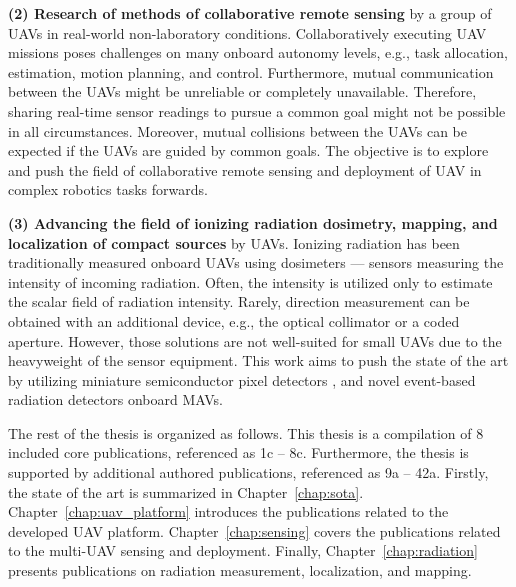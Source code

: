 \documentclass[a4paper,11pt,twoside,openright]{book}
\begin{document}
\textbf{(2) Research of methods of collaborative remote sensing} by a group of \aclp{UAV} in real-world non-laboratory conditions.
Collaboratively executing UAV missions poses challenges on many onboard autonomy levels, e.g., task allocation, estimation, motion planning, and control.
Furthermore, mutual communication between the \acp{UAV} might be unreliable or completely unavailable.
Therefore, sharing real-time sensor readings to pursue a common goal might not be possible in all circumstances.
Moreover, mutual collisions between the \acp{UAV} can be expected if the \acp{UAV} are guided by common goals.
The objective is to explore and push the field of collaborative remote sensing and deployment of \ac{UAV} in complex robotics tasks forwards.

\textbf{(3) Advancing the field of ionizing radiation dosimetry, mapping, and localization of compact sources} by \aclp{UAV}.
Ionizing radiation has been traditionally measured onboard \acp{UAV} using dosimeters \cite{nagatani2013emergency, sanada2015aerial, towler2012radiation, jiang2016prototype} --- sensors measuring the intensity of incoming radiation.
Often, the intensity is utilized only to estimate the scalar field of radiation intensity.
Rarely, direction measurement can be obtained with an additional device, e.g., the optical collimator or a coded aperture.
However, those solutions are not well-suited for small \acp{UAV} due to the heavyweight of the sensor equipment.
This work aims to push the state of the art by utilizing miniature semiconductor pixel detectors \cite{llopart2007timepix}, and novel event-based radiation detectors \cite{poikela2014timepix3} onboard \acp{MAV}.

The rest of the thesis is organized as follows.
This thesis is a compilation of 8 included core publications, referenced as 1c -- 8c.
Furthermore, the thesis is supported by additional authored publications, referenced as 9a -- 42a.
Firstly, the state of the art is summarized in Chapter~\ref{chap:sota}.
Chapter~\ref{chap:uav_platform} introduces the publications related to the developed \ac{UAV} platform.
Chapter~\ref{chap:sensing} covers the publications related to the multi-\ac{UAV} sensing and deployment.
Finally, Chapter~\ref{chap:radiation} presents publications on radiation measurement, localization, and mapping.



\end{document}
